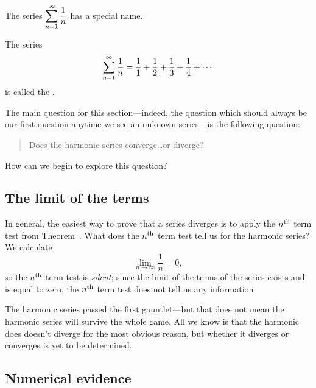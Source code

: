 The series $\displaystyle\sum_{n=1}^\infty {1\over n}$ has a special name.
\begin{definition}
  The series $$\displaystyle\sum_{n=1}^\infty {1\over n} = \frac{1}{1} +
  \frac{1}{2} + \frac{1}{3} + \frac{1}{4} + \cdots$$ is called the
  .
\end{definition}
The main question for this section---indeed, the question which should
always be our first question anytime we see an unknown series---is the
following question:
\begin{quote}
  Does the harmonic series converge\ldots or diverge?
\end{quote}
How can we begin to explore this question?

\subsection{The limit of the terms}


In general, the easiest way to prove that a series diverges is to
apply the $n^{\mbox{\scriptsize th}}$ term test from Theorem~.
What does the $n^{\mbox{\scriptsize th}}$ term test tell us for the harmonic series?
We calculate
$$
\lim_{n \to \infty} \frac{1}{n} = 0,
$$
so the $n^{\mbox{\scriptsize th}}$ term test is \textit{silent}; since the limit of the
terms of the series exists and is equal to zero, the $n^{\mbox{\scriptsize th}}$ term
test does not tell us any information.

The harmonic series passed the first gauntlet---but that does not mean
the harmonic series will survive the whole game.  All we know is that
the harmonic does doesn't diverge for the most obvious reason, but
whether it diverges or converges is yet to be determined.

\subsection{Numerical evidence}

